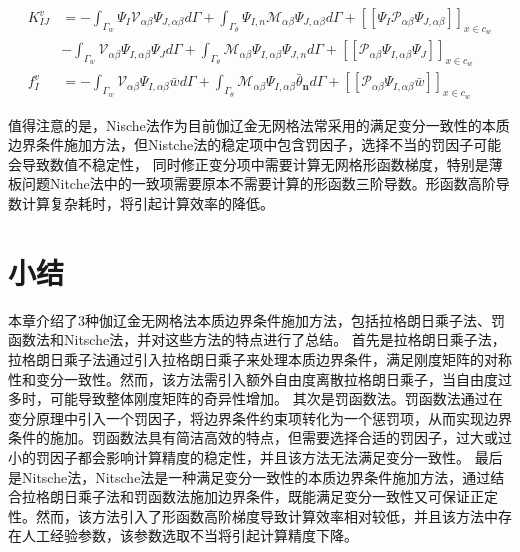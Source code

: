 \begin{subequations}\label{Pkv}
\begin{align}
 K^v_{IJ}&=-\int_{\Gamma_w}\Psi_I\mathcal{V}_{\alpha\beta}\Psi_{J,\alpha\beta}d\Gamma+\int_{\Gamma_{\theta}}\Psi_{I,n}\mathcal{M}_{\alpha\beta}\Psi_{J,\alpha\beta}d\Gamma+[[\Psi_I\mathcal{P}_{\alpha\beta}\Psi_{J,\alpha\beta}]]_{x\in{c_w}}\nonumber\\
     &-\int_{\Gamma_w}\mathcal{V}_{\alpha\beta}\Psi_{I,\alpha\beta}\Psi_Jd\Gamma+\int_{\Gamma_{\theta}}\mathcal{M}_{\alpha\beta}\Psi_{I,\alpha\beta}\Psi_{J,n}d\Gamma+[[\mathcal{P}_{\alpha\beta}\Psi_{I,\alpha\beta}\Psi_J]]_{x\in{c_w}}\\
 f_{I}^v&=-\int_{\Gamma_w}\mathcal{V}_{\alpha\beta}\Psi_{I,\alpha\beta}\bar{w}d\Gamma+\int_{\Gamma_{\theta}}\mathcal{M}_{\alpha\beta}\Psi_{I,\alpha\beta}\bar{\theta}_{\pmb n}d\Gamma+[[\mathcal{P}_{\alpha\beta}\Psi_{I,\alpha\beta}\bar{w}]]_{x\in{c_w}}
\end{align}
\end{subequations}
\par
值得注意的是，Nische法作为目前伽辽金无网格法常采用的满足变分一致性的本质边界条件施加方法，但Nistche法的稳定项中包含罚因子，选择不当的罚因子可能会导致数值不稳定性，
同时修正变分项中需要计算无网格形函数梯度，特别是薄板问题Nitche法中的一致项需要原本不需要计算的形函数三阶导数。形函数高阶导数计算复杂耗时，将引起计算效率的降低。
\section{小结}
本章介绍了3种伽辽金无网格法本质边界条件施加方法，包括拉格朗日乘子法、罚函数法和Nitsche法，并对这些方法的特点进行了总结。
首先是拉格朗日乘子法，拉格朗日乘子法通过引入拉格朗日乘子来处理本质边界条件，满足刚度矩阵的对称性和变分一致性。然而，该方法需引入额外自由度离散拉格朗日乘子，当自由度过多时，可能导致整体刚度矩阵的奇异性增加。
其次是罚函数法。罚函数法通过在变分原理中引入一个罚因子，将边界条件约束项转化为一个惩罚项，从而实现边界条件的施加。罚函数法具有简洁高效的特点，但需要选择合适的罚因子，过大或过小的罚因子都会影响计算精度的稳定性，并且该方法无法满足变分一致性。
最后是Nitsche法，Nitsche法是一种满足变分一致性的本质边界条件施加方法，通过结合拉格朗日乘子法和罚函数法施加边界条件，既能满足变分一致性又可保证正定性。然而，该方法引入了形函数高阶梯度导致计算效率相对较低，并且该方法中存在人工经验参数，该参数选取不当将引起计算精度下降。




